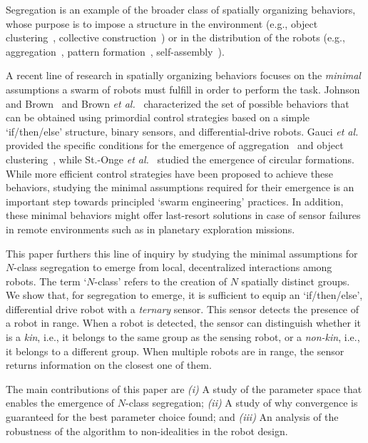 \documentclass[letterpaper, 10 pt, conference]{ieeeconf}
\begin{document}
Segregation is an example of the broader class of spatially organizing
behaviors, whose purpose is to impose a structure in the environment (e.g.,
object clustering~\cite{gauci_clustering_2014}, collective
construction~\cite{Bolger2010}) or in the distribution of the robots (e.g.,
aggregation~\cite{shlyakhov_survey_2017}, pattern
formation~\cite{Pinciroli:DARS2016}, self-assembly~\cite{gross2008self}).

A recent line of research in spatially organizing behaviors focuses on the
\emph{minimal} assumptions a swarm of robots must fulfill in order to perform the
task. Johnson and Brown~\cite{johnson_evolving_2016} and Brown \emph{et
  al.}~\cite{brown_discovery_2018} characterized the set of possible behaviors
that can be obtained using primordial control strategies based on a simple
`if/then/else' structure, binary sensors, and differential-drive robots. Gauci
\emph{et al.} provided the specific conditions for the emergence of
aggregation~\cite{gauci_evolving_2014} and object
clustering~\cite{gauci_clustering_2014}, while St.-Onge \emph{et
  al.}~\cite{StOnge:IROS2018} studied the emergence of circular
formations. While more efficient control strategies have been proposed to
achieve these behaviors, studying the minimal assumptions required for their emergence is
an important step towards principled `swarm engineering' practices. In addition,
these minimal behaviors might offer last-resort solutions in case of sensor
failures in remote environments such as in planetary exploration missions.

This paper furthers this line of inquiry by studying the minimal assumptions for
$N$-class segregation to emerge from local, decentralized interactions among
robots. The term `$N$-class' refers to the creation of $N$ spatially distinct
groups. We show that, for segregation to emerge, it is sufficient to equip an
`if/then/else', differential drive robot with a \emph{ternary} sensor. This
sensor detects the presence of a robot in range. When a robot is detected, the
sensor can distinguish whether it is a \emph{kin}, i.e., it belongs to the same
group as the sensing robot, or a \emph{non-kin}, i.e., it belongs to a different
group. When multiple robots are in range, the sensor returns information on the
closest one of them.

The main contributions of this paper are \emph{(i)} A study of the parameter
space that enables the emergence of $N$-class segregation; \emph{(ii)} A study
of why convergence is guaranteed for the best parameter choice found; and
\emph{(iii)} An analysis of the robustness of the algorithm to non-idealities in
the robot design.
\end{document}
